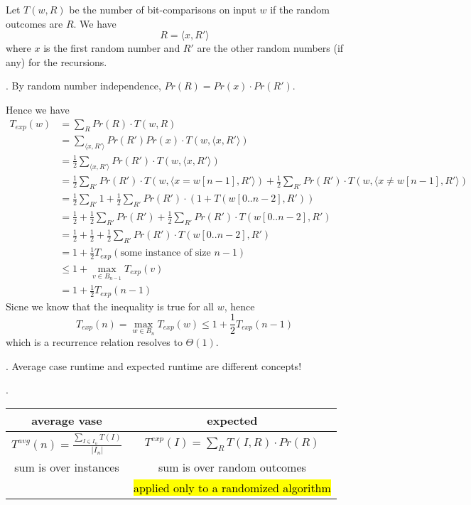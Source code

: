\documentclass{article}
\begin{document}
\begin{solution}
    Let $T(w, R)$ be the number of bit-comparisons on input $w$ if the random outcomes are $R$. We have 
    \[ R = \langle x, R' \rangle \] 
    where $x$ is the first random number and $R'$ are the other random numbers (if any) for the recursions. 
    \begin{comm}[].
        By random number independence, $Pr(R) = Pr(x) \cdot Pr(R')$. 
    \end{comm} 
    Hence we have \begin{align*}
        T_{exp}(w) 
        & = \sum_{R} Pr(R) \cdot T(w, R) \\ 
        & = \sum_{\langle x, R' \rangle} Pr(R') Pr(x) \cdot T(w, \langle x, R' \rangle) \\ 
        & = \frac{1}{2} \sum_{\langle x, R' \rangle} Pr(R') \cdot T(w, \langle x, R' \rangle) \\ 
        & = \frac{1}{2} \sum_{R'} Pr(R') \cdot T(w, \langle x=w[n-1], R' \rangle) + \frac{1}{2} \sum_{R'} Pr(R') \cdot T(w, \langle x \neq w [n-1], R' \rangle) \\ 
        & = \frac{1}{2} \sum_{R'} 1 + \frac{1}{2} \sum_{R'} Pr(R') \cdot (1 + T(w[0..n-2], R')) \\ 
        & = \frac{1}{2} + \frac{1}{2} \sum_{R'} Pr(R') + \frac{1}{2} \sum_{R'} Pr(R') \cdot T(w[0..n-2], R') \\ 
        & = \frac{1}{2} + \frac{1}{2} + \frac{1}{2} \sum_{R'} Pr(R') \cdot T(w[0..n-2], R') \\ 
        & = 1 + \frac{1}{2} T_{exp} (\text{some instance of size } n-1) \\ 
        & \leq 1 + \max_{v \in B_{n-1}} T_{exp} (v) \\ 
        & = 1 + \frac{1}{2} T_{exp}(n-1) 
    \end{align*}
    Sicne we know that the inequality is true for all $w$, hence 
    \[ T_{exp}(n) = \max_{w \in B_n} T_{exp}(w) \leq 1 + \frac{1}{2} T_{exp}(n-1) \]
    which is a recurrence relation resolves to $\Theta(1)$. 
\end{solution} 

\begin{discovery}[].
    Average case runtime and expected runtime are different concepts!
\end{discovery} 

\newpage

\begin{result}[].
    \begin{center}
        \begin{tabular}{c | c}
            \textbf{average vase} & \textbf{expected} \\ \hline
            $\displaystyle T^{avg}(n) = \frac{\sum_{I \in I_n} T(I)}{|I_n|}$ & $\displaystyle T^{exp}(I) = \sum_{R} T(I, R) \cdot Pr(R)$ \\ 
            sum is over instances & sum is over random outcomes \\ 
            & \hl{applied only to a randomized algorithm}
        \end{tabular}
    \end{center}
\end{result}
\end{document}

